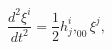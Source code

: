 \begin{equation}
\frac{d^{2}\xi ^{i}}{dt^{2}}=\frac{1}{2}h_{j}^{i},_{00}\xi ^{j},  \label{36}
\end{equation}

